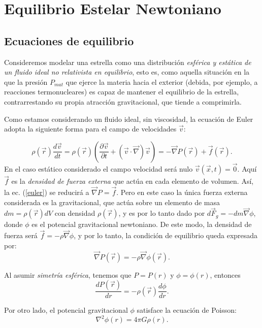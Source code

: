 \chapter{Equilibrio Estelar Newtoniano}\label{chap:eq_newton}

\section{Ecuaciones de equilibrio}
Consideremos modelar una estrella como una distribución \textit{esférica y estática de un fluido ideal no relativista en equilibrio}, esto es, como aquella situación en la que la presión $P_{mat}$ que ejerce la materia hacia el exterior (debida, por ejemplo, a reacciones termonucleares)  es capaz de mantener el equilibrio de la estrella, contrarrestando su propia
atracción gravitacional, que tiende a comprimirla.

Como estamos considerando un fluido ideal, sin viscosidad, la ecuación de Euler adopta la siguiente forma para el campo de velocidades $\vec{v}$:

\begin{equation}\label{euler}
\rho(\vec{r})\frac{d\vec{v}}{dt}=\rho(\vec{r})\left( \dfrac{\partial\vec{v}}{\partial t}+(\vec{v}\cdot\vec{\nabla})\vec{v}\right)=-\vec{\nabla}P(\vec{r})+\vec{f} (\vec{r}).
\end{equation}
En el caso estático considerado el campo velocidad será nulo $\vec{v}(\vec{x},t)=\vec{0}$. Aquí $\vec{f}$ es la \textit{densidad de fuerza externa} que actúa en cada elemento de volumen. Así, la ec. (\ref{euler}) se reducirá a $\vec{\nabla}P=\vec{f}$. Pero en este caso la única fuerza externa considerada es la gravitacional, que actúa sobre un elemento de masa $dm=\rho(\vec{r})dV$ con densidad $\rho(\vec{r})$, y es por lo tanto dado por $d\vec{F}_g=-dm\vec{\nabla}\phi$, donde $\phi$ es el potencial gravitacional newtoniano. De este modo, la densidad de fuerza será $\vec{f}=-\rho\vec{\nabla}\phi$, y por lo tanto, la condición de equilibrio queda expresada por:
\begin{equation}\label{equi}
\vec{\nabla}P(\vec{r})=-\rho\vec{\nabla}\phi(\vec{r}).
\end{equation}

Al asumir \textit{simetría esférica}, tenemos que $P=P(r)$ y $\phi=\phi(r)$, entonces
\begin{equation}\label{equir}
\frac{dP(\vec{r})}{dr}=-\rho(\vec{r})\frac{d\phi}{dr}.
\end{equation}

Por otro lado, el potencial gravitacional $\phi$ satisface la ecuación de Poisson:
\begin{equation}\label{n2p}
\nabla^2\phi(r)=4\pi G\rho(r).
\end{equation}

